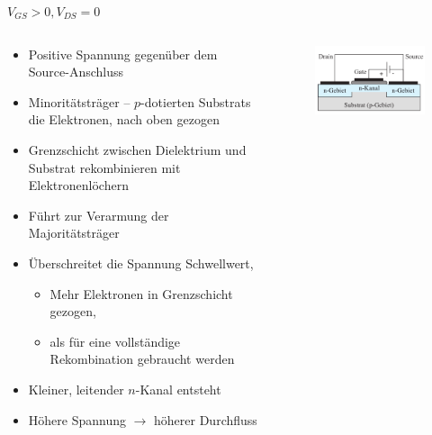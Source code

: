 \documentclass[12pt%
,aspectratio=169%
]{beamer}
\begin{document}
\begin{frame}{$V_{GS} > 0, V_{DS} = 0$}
\begin{columns}[T] %
\begin{column}{.62\textwidth}
	\begin{itemize}
		\item Positive Spannung gegenüber dem Source-Anschluss
		\item Minoritätsträger -- $p$-dotierten Substrats die Elektronen, nach oben gezogen
		\item Grenzschicht zwischen Dielektrium und Substrat rekombinieren mit Elektronenlöchern
		\item Führt zur Verarmung der Majoritätsträger
		\item Überschreitet die Spannung Schwellwert,
		\begin{itemize}
			\item Mehr Elektronen in Grenzschicht gezogen,
			\item als für eine vollständige Rekombination gebraucht werden
		\end{itemize}
		\item Kleiner, leitender $n$-Kanal entsteht
		\item Höhere Spannung $\to$ höherer Durchfluss
	\end{itemize}
\end{column}%
\hfill%
\begin{column}{.38\textwidth}
\begin{figure}
\center
\includegraphics[scale=0.5]{pictures/fall2}\\
\end{figure}
\end{column}%
\end{columns}
\end{frame}
\end{document}
